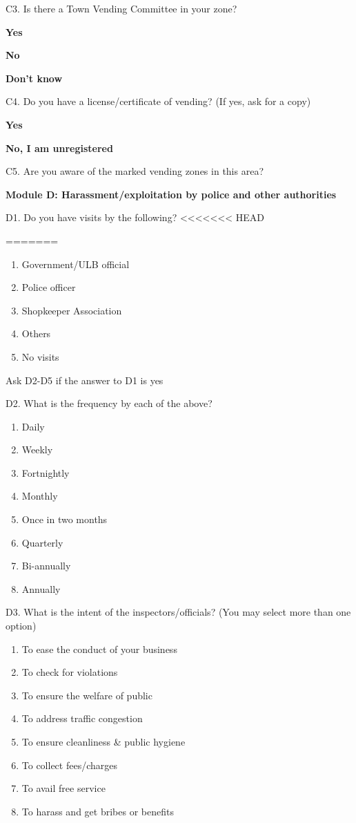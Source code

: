 \documentclass[a4paper, 12pt, twoside]{article}
\begin{document}
{{\begin{mdframed}[backgroundcolor=gray!20]
C3. Is there a Town Vending Committee in your zone?

\textbf{Yes}

\textbf{No}

\textbf{Don’t know}

C4. Do you have a license/certificate of vending? (If yes, ask for a copy)

\textbf{Yes}

\textbf{No, I am unregistered}

C5. Are you aware of the marked vending zones in this area?

\textbf{Module D: Harassment/exploitation by police and other authorities}

D1. Do you have visits by the following?
<<<<<<< HEAD
\begin{enumerate}
=======
\begin{enumerate}[nosep]
>>>>>>> 5b007322ba2df55649fdbe03de9d7609dbc86c7c
\item Government/ULB official
\item Police officer
\item Shopkeeper Association
\item Others
\item No visits
\end{enumerate}

Ask D2-D5 if the answer to D1 is yes

D2. What is the frequency by each of the above?
\begin{enumerate}[nosep]
\item Daily
\item Weekly
\item Fortnightly
\item Monthly
\item Once in two months
\item Quarterly
\item Bi-annually
\item Annually
\end{enumerate}

D3. What is the intent of the inspectors/officials? (You may select more than one option)
\begin{enumerate}[nosep]
\item To ease the conduct of your business
\item To check for violations
\item To ensure the welfare of public
\item To address traffic congestion
\item To ensure cleanliness \& public hygiene
\item To collect fees/charges
\item To avail free service
\item To harass and get bribes or benefits
\end{enumerate}


\end{enumerate}
\end{mdframed}}}
\end{document}
